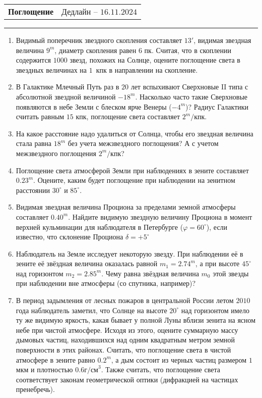 \documentclass[12pt]{article}
\begin{document}
 \begin{tabularx}{\textwidth}{Xr}
  {\Large \textbf{Поглощение}} & Дедлайн -- $16.11.2024$ \\
 \end{tabularx}
 \noindent\rule{\textwidth}{0.4pt}
 \begin{enumerate}
        \item Видимый поперечник звездного скопления составляет $13'$, видимая звездная величина $9^m$, диаметр скопления равен $6$ пк. Считая, что в скоплении содержится $1000$ звезд, похожих на Солнце, оцените поглощение света в звездных величинах на $1$~кпк в направлении на скопление.
        \item В Галактике Млечный Путь раз в $20$ лет вспыхивают Сверхновые II типа с абсолютной звездной величиной $-18^m$. Насколько часто такие Сверхновые появляются в небе Земли с блеском ярче Венеры ($-4^m$)? Радиус Галактики считать равным $15$ кпк, поглощение света составляет $2^m/\text{кпк}$.
        \item На какое расстояние надо удалиться от Солнца, чтобы его звездная величина стала равна $18^m$ без учета межзвездного поглощения? А с учетом межзвездного поглощения $2^m/\text{кпк}$? 
        \item Поглощение света атмосферой Земли при наблюдениях в зените составляет $0.23^m$. Оцените, каким будет поглощение при наблюдении на зенитном расстоянии $30^{\circ}$ и $85^{\circ}$. 
        \item Видимая звездная величина Проциона за пределами земной атмосферы составляет $0.40^m$. Найдите видимую звездную величину Проциона в момент верхней кульминации для наблюдателя в Петербурге ($\varphi=60^{\circ}$), если известно, что склонение Проциона $\delta = +5^{\circ}$
        \item Наблюдатель на Земле исследует некоторую звезду. При наблюдении её в зените её звёздная величина оказалась равной $m_1 = 2.74^m$, а при высоте $45^{\circ}$ над горизонтом $m_2 = 2.85^m$. Чему равна звёздная величина $m_0$ этой звезды при наблюдении вне атмосферы (со спутника, например)?
        \item В период задымления от лесных пожаров в центральной России летом $2010$ года наблюдатель заметил, что Солнце на высоте $20^{\circ}$ над горизонтом имело ту же видимую яркость, какая бывает у полной Луны вблизи зенита на ясном небе при чистой атмосфере. Исходя из этого, оцените суммарную массу дымовых частиц, находившихся над одним квадратным метром земной поверхности в этих районах. Считать, что поглощение света в чистой атмосфере в зените равно $0.2^m$, а дым состоит из черных частиц размером $1$ мкм и плотностью $0.6 \mbox{г/см}^3$. Также считать, что поглощение света соответствует законам геометрической оптики (дифракцией на частицах пренебречь). 
 \end{enumerate}
\end{document}
